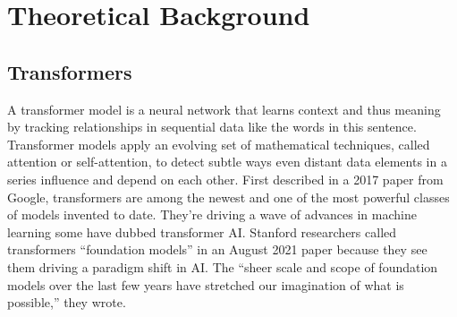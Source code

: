 \chapter{Theoretical Background}
\section{Transformers}
        A transformer model is a neural network that learns context and thus meaning by tracking relationships in sequential data like the words in this sentence.
        Transformer models apply an evolving set of mathematical techniques, called attention or self-attention, to detect subtle ways even distant data elements in a series influence and depend on each other.
        First described in a 2017 paper from Google\cite{vaswani2023attention}, transformers are among the newest and one of the most powerful classes of models invented to date. They’re driving a wave of advances in machine learning some have dubbed transformer AI.
        Stanford researchers called transformers “foundation models” in an August 2021 paper\cite{bommasani2021opportunities} because they see them driving a paradigm shift in AI. The “sheer scale and scope of foundation models over the last few years have stretched our imagination of what is possible,” they wrote.

        \begin{figure}[hbt!]
        \end{figure}

